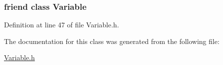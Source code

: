 \subsubsection[{\texorpdfstring{Variable}{Variable}}]{\setlength{\rightskip}{0pt plus 5cm}friend class {\bf Variable}\hspace{0.3cm}{\ttfamily [friend]}}\hypertarget{classocra_1_1VariableHasRestrictedClassDerivation_a9b0a9a1a9dc58fc36b535bb33c612b49}{}\label{classocra_1_1VariableHasRestrictedClassDerivation_a9b0a9a1a9dc58fc36b535bb33c612b49}


Definition at line 47 of file Variable.\+h.



The documentation for this class was generated from the following file\+:\begin{DoxyCompactItemize}
\item 
\hyperlink{Variable_8h}{Variable.\+h}\end{DoxyCompactItemize}
